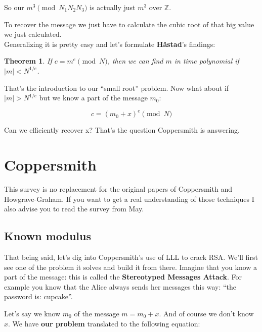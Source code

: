 \documentclass[a4paper,11pt]{article}
\newtheorem{theorem}{Theorem}
\begin{document}
So our $m^3 \pmod{N_1 N_2 N_3}$ is actually just $m^3$ over $\mathbb{Z}$. 

To recover the message we just have to calculate the cubic root of that big value we just calculated.\\

Generalizing it is pretty easy and let's formulate \textbf{Håstad}'s findings:

\begin{theorem}
If $c = m^e \pmod{N}$, then we can find $m$ in time polynomial if $|m| < N^{1/e}$.
\end{theorem}

That's the introduction to our ``small root'' problem. Now what about if $|m| > N^{1/e}$ but we know a part of the message $m_0$:

\[ c = (m_0 + x)^e \pmod{N} \]

Can we efficiently recover x? That's the question Coppersmith is answering.




\section{Coppersmith}\label{coppersmith}

This survey is no replacement for the original papers of Coppersmith\cite{coppersmith} and Howgrave-Graham\cite{howgrave-graham}. If you want to get a real understanding of those techniques I also advise you to read the survey from May\cite{may}.

\subsection{Known modulus}\label{knownmodulus}

That being said, let's dig into Coppersmith's use of LLL to crack RSA. We'll first see one of the problem it solves and build it from there. Imagine that you know a part of the message: this is called the \textbf{Stereotyped Messages Attack}. For example you know that the Alice always sends her messages this way: ``the password is: cupcake''.

Let's say we know $m_0$ of the message $m = m_0 + x$. And of course we don't know $x$. We have \textbf{our problem} translated to the following equation:
\end{document}
